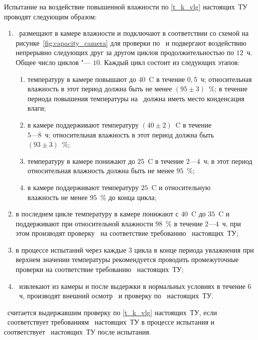Испытание на воздействие повышенной влажности по \ref{t_k_vlg} настоящих~ТУ проводят следующим образом:
%
\begin{enumerate}
	\item \dut \ размещают в камере влажности и подключают в соответствии со схемой на рисунке~\ref{fig:capacity_camera} для проверки по \treb \ и подвергают воздействию непрерывно следующих друг за другом циклов продолжительностью по $12$~ч. Общее число циклов "--- $10$. Каждый цикл состоит из следующих этапов:
	\begin{enumerate}
		\item температуру в камере повышают до $40$~\degree C в течение $0,5$~ч; относительная влажность в этот период должна быть не менее $(95 \pm 3)$~\%; в течение периода повышения температуры на \dut \ должна иметь место конденсация влаги;
		\item в камере поддерживают температуру $(40 \pm 2)$~\degree C в течение \\ $5$---$8$~ч; относительная влажность в этот период должна быть \\ $(93 \pm 3)$~\%;
		\item температуру в камере понижают до $25$~\degree C в течение $2$---$4$~ч; в этот период относительная влажность должна быть не менее $95$~\%;
		\item в камере поддерживают температуру $25$~\degree C и относительную \\ влажность не менее $95$~\% до конца цикла;
		\end{enumerate}
	\item в последнем цикле температуру в камере понижают с $40$~\degree C до $35$~\degree C и поддерживают при относительной влажности $98$~\% в течение $2$---$4$~ч, при этом производят проверку \dut \ на соответствие требованию \treb \ настоящих~ТУ;
	\item в процессе испытаний через каждые 3 цикла в конце периода увлажнения при верхнем значении температуры рекомендуется проводить промежуточные проверки на соответствие требованию \treb \ настоящих~ТУ;
	\item \dut \ извлекают из камеры и после выдержки в нормальных условиях в течение $6$~ч, производят внешний осмотр \dut \ и проверку по \trebafter \ настоящих~ТУ.
\end{enumerate}

\dut \ считается выдержавшим проверку по \ref{t_k_vlg} настоящих~ТУ, если \dut \ соответствует требованиям \treb \ настоящих~ТУ в процессе испытания и соответствует \trebafter \ настоящих~ТУ после испытания.